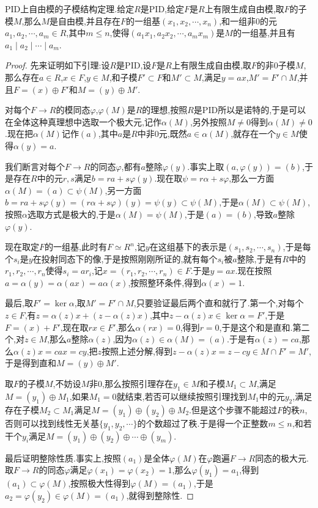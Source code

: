 PID上自由模的子模结构定理.给定$R$是PID,给定$F$是$R$上有限生成自由模,取$F$的子模$M$,那么$M$是自由模,并且存在$F$的一组基$(x_1,x_2,\cdots,x_n)$,和一组非0的元$a_1,a_2,\cdots,a_m\in R$,其中$m\le n$,使得$(a_1x_1,a_2x_2,\cdots,a_mx_m)$是$M$的一组基,并且有$a_1\mid a_2\mid\cdots\mid a_m$.
\begin{proof}
	
	先来证明如下引理:设$R$是PID,设$F$是$R$上有限生成自由模,取$F$的非0子模$M$,那么存在$a\in R$,$x\in F$,$y\in M$,和子模$F'\subset F$和$M'\subset M$,满足$y=ax$,$M'=F'\cap M$,并且$F=(x)\oplus F'$和$M=(y)\oplus M'$.
	
	对每个$F\to R$的模同态$\varphi$,$\varphi(M)$是$R$的理想,按照$R$是PID所以是诺特的,于是可以在全体这种真理想中选取一个极大元,记作$\alpha(M)$,另外按照$M\not=0$得到$\alpha(M)\not=0$.现在把$\alpha(M)$记作$(a)$,其中$a$是$R$中非0元,既然$a\in\alpha(M)$,就存在一个$y\in M$使得$\alpha(y)=a$.
	
	我们断言对每个$F\to R$的同态$\varphi$,都有$a$整除$\varphi(y)$.事实上取$(a,\varphi(y))=(b)$,于是存在$R$中的元$r,s$满足$b=ra+s\varphi(y)$.现在取$\psi=r\alpha+s\varphi$,那么一方面$\alpha(M)=(a)\subset\psi(M)$,另一方面$b=ra+s\varphi(y)=(r\alpha+s\varphi)(y)=\psi(y)\subset\psi(M)$,于是$\alpha(M)\subset\psi(M)$,按照$\alpha$选取方式是极大的,于是$\alpha(M)=\psi(M)$,于是$(a)=(b)$,导致$a$整除$\varphi(y)$.
	
	现在取定$F$的一组基,此时有$F\simeq R^n$,记$y$在这组基下的表示是$(s_1,s_2,\cdots,s_n)$,于是每个$s_i$是$y$在投射同态下的像,于是按照刚刚所证的,就有每个$s_i$被$a$整除,于是有$R$中的$r_1,r_2,\cdots,r_n$使得$s_i=ar_i$,记$x=(r_1,r_2,\cdots,r_n)\in F$.于是$y=ax$.现在按照$a=\alpha(y)=\alpha(ax)=a\alpha(x)$,按照整环条件,得到$\alpha(x)=1$.
	
	最后,取$F'=\ker\alpha$,取$M'=F'\cap M$,只要验证最后两个直和就行了.第一个,对每个$z\in F$,有$z=\alpha(z)x+(z-\alpha(z)x)$,其中$z-\alpha(z)x\in\ker\alpha=F'$,于是$F=(x)+F'$,现在取$rx\in F'$,那么$\alpha(rx)=0$,得到$r=0$,于是这个和是直和.第二个,对$z\in M$,那么$a$整除$\alpha(z)$,因为$\alpha(z)\in\alpha(M)=(a)$.于是有$\alpha(z)=ca$,那么$\alpha(z)x=cax=cy$,把$z$按照上述分解,得到$z-\alpha(z)x=z-cy\in M\cap F'=M'$,于是得到直和$M=(y)\oplus M'$.
	
	取$F$的子模$M$,不妨设$M$非0,那么按照引理存在$y_1\in M$和子模$M_1\subset M$,满足$M=(y_1)\oplus M_1$,如果$M_1=0$就结束,若否可以继续按照引理找到$M_1$中的元$y_2$,满足存在子模$M_2\subset M_1$满足$M=(y_1)\oplus (y_2)\oplus M_2$.但是这个步骤不能超过$F$的秩$n$,否则可以找到线性无关基$\{y_1,y_2,\cdots\}$的个数超过了秩.于是得一个正整数$m\le n$,和若干个$y_i$满足$M=(y_1)\oplus (y_2)\oplus\cdots\oplus (y_m)$.
	
	最后证明整除性质.事实上,按照$(a_1)$是全体$\varphi(M)$在$\varphi$跑遍$F\to R$同态的极大元.取$F\to R$的同态$\varphi$满足$\varphi(x_1)=\varphi(x_2)=1$,那么$\varphi(y_1)=a_1$,得到$(a_1)\subset\varphi(M)$,按照极大性得到$\varphi(M)=(a_1)$,于是$a_2=\varphi(y_2)\in\varphi(M)=(a_1)$,就得到整除性.
\end{proof}

